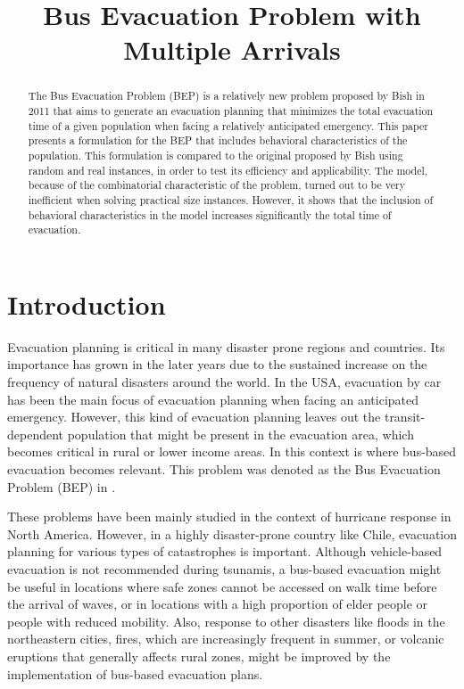 \documentclass[conference]{IEEEtran}
\begin{document}
\title{Bus Evacuation Problem with Multiple Arrivals}

\author{
}

\maketitle

\begin{abstract}
 The Bus Evacuation Problem (BEP) is a relatively new problem proposed by Bish in 2011 that aims to generate an evacuation planning that minimizes the total evacuation time of a given population when facing a relatively anticipated emergency. This paper presents a formulation for the BEP that includes behavioral characteristics of the population. This formulation is compared to the original proposed by Bish using random and real instances, in order to test its efficiency and applicability. The model, because of the combinatorial characteristic of the problem, turned out to be very inefficient when solving practical size instances. However, it shows that the inclusion of behavioral characteristics in the model increases significantly the total time of evacuation. 
\end{abstract}


\section{Introduction}
Evacuation planning is critical in many disaster prone regions and countries. Its importance has grown in the later years due to the sustained increase on the frequency of natural disasters around the world. In the USA, evacuation by car has been the main focus of evacuation planning when facing an anticipated emergency. However, this kind of evacuation planning leaves out the transit-dependent population that might be present in the evacuation area, which becomes critical in rural or lower income areas. In this context is where bus-based evacuation becomes relevant. This problem was denoted as the Bus Evacuation Problem (BEP) in \cite{b1}.

These problems have been mainly studied in the context of hurricane response in North America. However, in a highly disaster-prone country like Chile, evacuation planning for various types of catastrophes is important. Although vehicle-based evacuation is not recommended during tsunamis, a bus-based evacuation might be useful in locations where safe zones cannot be accessed on walk time before the arrival of waves, or in locations with a high proportion of elder people or people with reduced mobility. Also, response to other disasters like floods in the northeastern cities, fires, which are increasingly frequent in summer, or volcanic eruptions that generally affects rural zones, might be improved by the implementation of bus-based evacuation plans.
\end{document}
